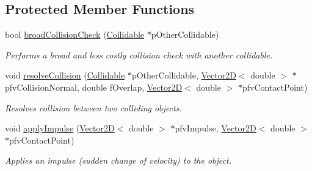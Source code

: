 \subsection*{Protected Member Functions}
\begin{DoxyCompactItemize}
\item 
bool \hyperlink{class_collidable_a7ec62c2d35206abacbcad74f5bf42608}{broad\+Collision\+Check} (\hyperlink{class_collidable}{Collidable} $\ast$p\+Other\+Collidable)
\begin{DoxyCompactList}\small\item\em Performs a broad and less costly collision check with another collidable. \end{DoxyCompactList}\item 
void \hyperlink{class_collidable_a8ff9b7822edd612abd581437343f76b0}{resolve\+Collision} (\hyperlink{class_collidable}{Collidable} $\ast$p\+Other\+Collidable, \hyperlink{class_vector2_d}{Vector2\+D}$<$ double $>$ $\ast$pfv\+Collision\+Normal, double f\+Overlap, \hyperlink{class_vector2_d}{Vector2\+D}$<$ double $>$ $\ast$pfv\+Contact\+Point)
\begin{DoxyCompactList}\small\item\em Resolves collision between two colliding objects. \end{DoxyCompactList}\item 
void \hyperlink{class_collidable_ab48a9401ae73d1c90a5200397b420f89}{apply\+Impulse} (\hyperlink{class_vector2_d}{Vector2\+D}$<$ double $>$ $\ast$pfv\+Impulse, \hyperlink{class_vector2_d}{Vector2\+D}$<$ double $>$ $\ast$pfv\+Contact\+Point)
\begin{DoxyCompactList}\small\item\em Applies an impulse (sudden change of velocity) to the object. \end{DoxyCompactList}\end{DoxyCompactItemize}
